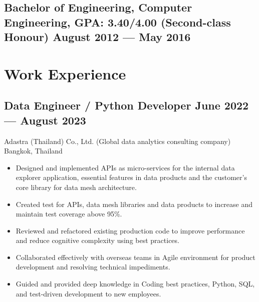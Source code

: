 \documentclass{article}
\newcommand{\subtext}[1]{
#1\par\vspace{-0.2cm}}
\newenvironment{zitemize}{
\begin{itemize}\itemsep0pt \parskip0pt \parsep1pt}
{\end{itemize}\vspace{-0.5cm}}
\begin{document}
        \subsection*{Bachelor of Engineering, Computer Engineering, {\normalsize \normalfont GPA: 3.40/4.00 \small{(Second-class Honour)}} \hfill August 2012 --- May 2016} 
        \vspace{0.1cm}

    \section{Work Experience}
    \vspace{-0.1cm}

        \subsection*{Data Engineer / Python Developer \hfill June 2022 --- August 2023} 
        \subtext{Adastra (Thailand) Co., Ltd. {\scriptsize (Global data analytics consulting company)} \hfill Bangkok, Thailand} 
            \vspace{0.05cm}
            \begin{zitemize}
                \item Designed and implemented APIs as micro-services for the internal data explorer application, essential features in data products and the customer's core library for data mesh architecture.
                \item Created test for APIs, data mesh libraries and data products to increase and maintain test coverage above 95\%.
                \item Reviewed and refactored existing production code to improve performance and reduce cognitive complexity using best practices.
                \item Collaborated effectively with overseas teams in Agile environment for product development and resolving technical impediments.
                \item Guided and provided deep knowledge in Coding best practices, Python, SQL, and test-driven development to new employees.
            \end{zitemize}
        \vspace{0.2cm}
    
\end{document}
